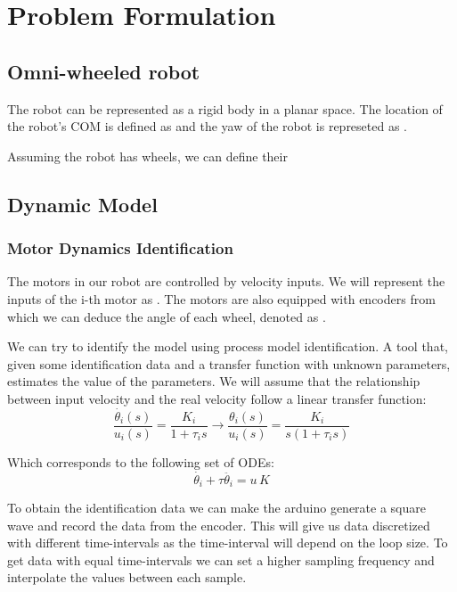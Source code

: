 %
\chapter{Problem Formulation} \label{chap::problem}


\section{Omni-wheeled robot} \label{sect::system}
The robot can be represented as a rigid body in a planar space. The location of the robot's \ac{COM} is defined as  and the yaw of the robot is represeted as .

Assuming the robot has  wheels, we can define their 


\section{Dynamic Model}

\newpage
\subsection{Motor Dynamics Identification}

The motors in our robot are controlled by velocity inputs. We will represent the inputs of the i-th motor as . The motors are also equipped with encoders from which we can deduce the angle of each wheel, denoted as .

We can try to identify the model using process model identification. A tool that, given some identification data and a transfer function with unknown parameters, estimates the value of the parameters. We will assume that the relationship between input velocity and the real velocity follow a linear transfer function:
\begin{equation}
\frac{\dot{\theta_i}(s)}{u_i(s)}=\frac{K_i}{1+\tau_i s}
\rightarrow
\frac{\theta_i(s)}{u_i(s)}=\frac{K_i}{s(1+\tau_i s)}
\end{equation}

Which corresponds to the following set of ODEs:
\begin{equation}
\dot{\theta_i}+\tau\ddot{\theta_i}=u\,K
\end{equation}

To obtain the identification data we can make the arduino generate a square wave and record the data from the encoder. This will give us data discretized with different time-intervals as the time-interval will depend on the loop size. To get data with equal time-intervals we can set a higher sampling frequency and interpolate the values between each sample.

